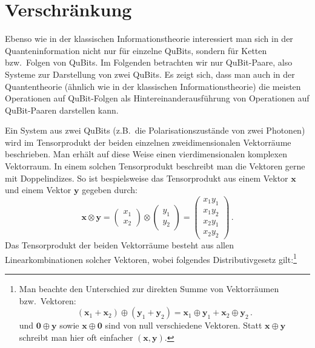 \section{Verschr\"ankung}

Ebenso 
wie in der klassischen Informationstheorie interessiert man sich in der Quanteninformation
nicht nur f\"ur einzelne QuBits, sondern f\"ur Ketten bzw.\ Folgen von QuBits. Im Folgenden betrachten wir
nur QuBit-Paare, also Systeme zur Darstellung von zwei QuBits. Es zeigt sich, dass man auch in der
Quantentheorie (\"ahnlich wie in der klassischen Informationstheorie) die meisten Operationen auf
QuBit-Folgen als Hintereinanderausf\"uhrung von Operationen auf QuBit-Paaren darstellen kann. 

Ein System aus zwei QuBits (z.B.\ die Polarisationszust\"ande von zwei Photonen) wird im Tensorprodukt
der beiden einzelnen zweidimensionalen Vektorr\"aume beschrieben. Man erh\"alt auf diese Weise einen
vierdimensionalen komplexen Vektorraum. 
In einem solchen Tensorprodukt
beschreibt man die Vektoren gerne mit Doppelindizes. So ist bespielsweise das Tensorprodukt aus
einem Vektor $\pmb{x}$ und einem Vektor $\pmb{y}$ gegeben durch:
\begin{equation}
\label{eq_QM1_Tensor}
       \pmb{x} \otimes \pmb{y} = \left( \begin{array}{c} x_1 \\ x_2 \end{array} \right) \otimes
          \left( \begin{array}{c} y_1 \\ y_2 \end{array} \right) =
           \left( \begin{array}{c} x_1 y_1  \\ x_1 y_2 \\ x_2 y_1 \\ x_2 y_2  \end{array} \right)
            \, .
\end{equation}
Das Tensorprodukt der beiden Vektorr\"aume besteht aus allen Linearkombinationen solcher
Vektoren, wobei folgendes 
Distributivgesetz gilt:\footnote{Man beachte den Unterschied zur
direkten Summe von Vektorr\"aumen bzw.\ Vektoren:
\[      (\pmb{x}_1 + \pmb{x}_2) \oplus (\pmb{y}_1 + \pmb{y}_2) = \pmb{x}_1  \oplus \pmb{y}_1 +
     \pmb{x}_2  \oplus \pmb{y}_2  \, . \]  
und $\pmb{0} \oplus \pmb{y}$ sowie $\pmb{x}\oplus \pmb{0}$ sind von null verschiedene Vektoren. Statt
$\pmb{x} \oplus \pmb{y}$ schreibt man hier oft einfacher $(\pmb{x},\pmb{y})$.}
